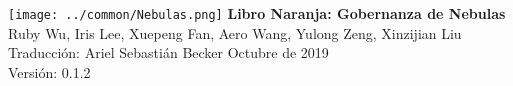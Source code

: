 \documentclass[12pt]{article}
\begin{document}
	\pagestyle{empty}
	\pagecolor{\pcolor}

	\begin{titlepage}
		\begin{center}
			\vspace*{5.5cm}
			\texttt{[image: ../common/Nebulas.png]}
			\vspace{0.5cm}
			\textbf{\huge{Libro Naranja: Gobernanza de Nebulas}}
			\vfill
			\vspace{0.5cm}
				Ruby Wu, Iris Lee, Xuepeng Fan, Aero Wang, Yulong Zeng, Xinzijian Liu \\
				Traducción: Ariel Sebastián Becker
			\vfill
			Octubre de 2019\\
			Versión: 0.1.2
			\textbf{}
		\end{center}
	\end{titlepage}

	\setcounter{page}{0}

	\tableofcontents

	\newpage
	\setcounter{page}{1}
	\pagestyle{fancy}
	\vspace*{0.01cm}

	\newpage

	\newpage
	\begin{appendices}
		\newpage
	\end{appendices}
\end{document}
